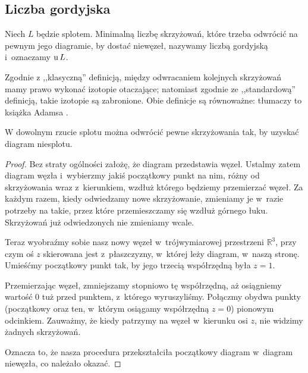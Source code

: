 
\subsection{Liczba gordyjska}
%

\begin{definition}
    Niech $L$ będzie splotem.
    Minimalną liczbę skrzyżowań, które trzeba odwrócić na pewnym jego diagramie, by dostać niewęzeł, nazywamy liczbą gordyjską i~oznaczamy $\operatorname{u} L$.
\end{definition}

Zgodnie z ,,klasyczną'' definicją, między odwracaniem kolejnych skrzyżowań mamy prawo wykonać izotopie otaczające; natomiast zgodnie ze ,,standardową'' definicją, takie izotopie są zabronione.
Obie definicje są równoważne: tłumaczy to książka Adamsa \cite[s. 58]{adams94}.

\begin{lemma}
    \label{lem:unknotting_well_defined}
    W dowolnym rzucie splotu można odwrócić pewne skrzyżowania tak, by uzyskać diagram niesplotu.
\end{lemma}

\begin{proof}
    Bez straty ogólności założę, że diagram przedstawia węzeł.
    Ustalmy zatem diagram węzła i~wybierzmy jakiś początkowy punkt na nim, różny od skrzyżowania wraz z~kierunkiem, wzdłuż którego będziemy przemierzać węzeł.
    Za każdym razem, kiedy odwiedzamy nowe skrzyżowanie, zmieniamy je w~razie potrzeby na takie, przez które przemieszczamy się wzdłuż górnego łuku.
    Skrzyżowań już odwiedzonych nie zmieniamy wcale.

    Teraz wyobraźmy sobie nasz nowy węzeł w~trójwymiarowej przestrzeni $\mathbb R^3$, przy czym oś $z$ skierowana jest z~płaszczyzny, w~której leży diagram, w~naszą stronę.
    Umieśćmy początkowy punkt tak, by jego trzecią współrzędną była $z = 1$.

    Przemierzając węzeł, zmniejszamy stopniowo tę współrzędną, aż osiągniemy wartość $0$ tuż przed punktem, z~którego wyruszyliśmy.
    Połączmy obydwa punkty (początkowy oraz ten, w~którym osiągamy współrzędną $z = 0$) pionowym odcinkiem.
    Zauważmy, że kiedy patrzymy na węzeł w~kierunku osi $z$, nie widzimy żadnych skrzyżowań.

    Oznacza to, że nasza procedura przekształciła początkowy diagram w~diagram niewęzła, co należało okazać.
\end{proof}


